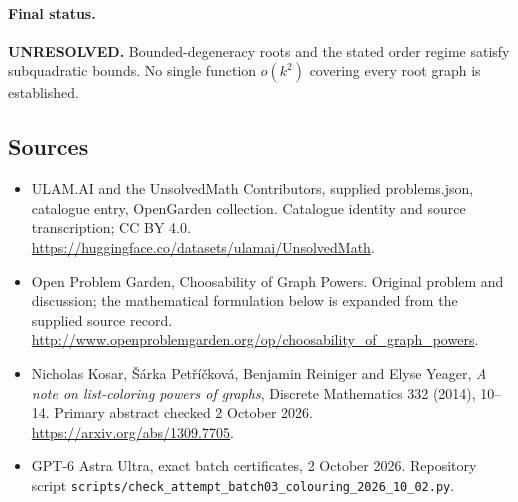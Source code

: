 \documentclass[11pt,a4paper]{article}
\begin{document}
\paragraph{Final status.}
\textbf{UNRESOLVED.} Bounded-degeneracy roots and the stated order
regime satisfy subquadratic bounds. No single function $o(k^2)$
covering every root graph is established.

\subsection{Sources}
\begin{itemize}
\item[S1] ULAM.AI and the UnsolvedMath Contributors, supplied problems.json, catalogue entry, OpenGarden collection. Catalogue identity and source transcription; CC BY 4.0.
\url{https://huggingface.co/datasets/ulamai/UnsolvedMath}.
\item[S2] Open Problem Garden, Choosability of Graph Powers. Original problem and discussion; the mathematical formulation below is expanded from the supplied source record.
\url{http://www.openproblemgarden.org/op/choosability_of_graph_powers}.

\item[R1] Nicholas Kosar, \v S\'arka Pet\v r\'i\v ckov\'a,
Benjamin Reiniger and Elyse Yeager, \emph{A note on list-coloring powers
of graphs}, Discrete Mathematics 332 (2014), 10--14. Primary abstract
checked 2 October 2026.
\url{https://arxiv.org/abs/1309.7705}.
\item[R2] GPT-6 Astra Ultra, exact batch certificates, 2 October 2026.
Repository script \texttt{scripts/check\_attempt\_batch03\_colouring\_2026\_10\_02.py}.

\end{itemize}
\end{document}

